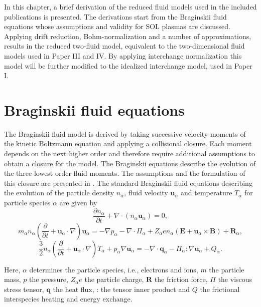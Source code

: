 In this chapter, a brief derivation of the reduced fluid models used in the included publications is presented. The derivations start from the Braginskii fluid equations whose assumptions and validity for SOL plasmas are discussed. Applying drift reduction, Bohm-normalization and a number of approximations, results in the reduced two-fluid model, equivalent to the two-dimensional fluid models used in Paper III and IV. By applying interchange normalization this model will be further modified to the idealized interchange model, used in Paper I. 

\section{Braginskii fluid equations}
The Braginskii fluid model is derived by taking successive velocity moments of the kinetic Boltzmann equation and applying a collisional closure. Each moment depends on the next higher order and therefore require additional assumptions to obtain a closure for the model. The Braginskii equations describe the evolution of the three lowest order fluid moments. The assumptions and the formulation of this closure are presented in \cite{braginskii}. The standard Braginskii fluid equations describing the evolution of the particle density $n_\alpha$, fluid velocity $\textbf{u}_\alpha$ and temperature $T_\alpha$ for particle species $\alpha$ are given by 
\begin{equation}\label{brag_1}
	\frac{\partial n_\alpha}{\partial t} + \nabla \cdot (n_\alpha \textbf{u}_\alpha) = 0,
\end{equation}
\begin{equation}\label{brag_2}
	m_\alpha n_\alpha \left(\frac{\partial}{\partial t} + \textbf{u}_\alpha \cdot \nabla\right)\textbf{u}_\alpha = - \nabla p_\alpha - \nabla \cdot \Pi_\alpha +Z_\alpha e n_\alpha\left(\textbf{E} + \textbf{u}_\alpha \times \textbf{B}\right) + \textbf{R}_\alpha ,
\end{equation}
\begin{equation}\label{brag_3}
	\frac{3}{2}n_\alpha \left(\frac{\partial}{\partial t} + \textbf{u}_\alpha \cdot \nabla\right)T_\alpha + p_\alpha \nabla \textbf{u}_\alpha = - \nabla \cdot \textbf{q}_\alpha - \Pi_\alpha : \nabla \textbf{u}_\alpha + Q_\alpha.
\end{equation}

Here, $\alpha$ determines the particle species, i.e., electrons and ions, $m$ the particle mass, $p$ the pressure, $Z_\alpha e$ the particle charge, $\textbf{R}$ the friction force, $\Pi$ the viscous stress tensor, $\textbf{q}$ the heat flux, : the tensor inner product and $Q$ the frictional interspecies heating and energy exchange.%

